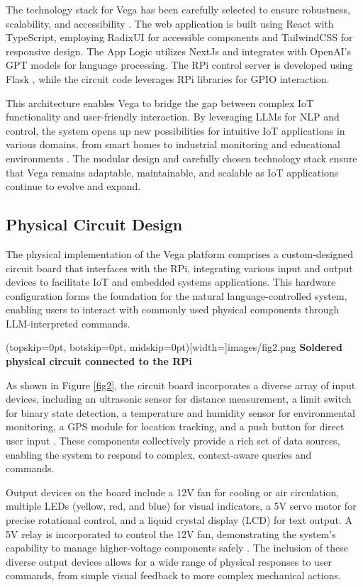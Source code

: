 \documentclass{ieeeaccess}
\begin{document}
The technology stack for Vega has been carefully selected to ensure robustness, scalability, and accessibility \cite{math9040308}. The web application is built using React \cite{React2024} with TypeScript, employing RadixUI \cite{radix-ui} for accessible components and TailwindCSS \cite{tailwindcss} for responsive design. The App Logic utilizes NextJs \cite{NextJS} and integrates with OpenAI's GPT models \cite{OpenAI_GPT} for language processing. The RPi control server is developed using Flask \cite{Flask2024}, while the circuit code leverages RPi libraries for GPIO interaction.

This architecture enables Vega to bridge the gap between complex IoT functionality and user-friendly interaction. By leveraging LLMs for NLP and control, the system opens up new possibilities for intuitive IoT applications in various domains, from smart homes to industrial monitoring and educational environments \cite{8067944}. The modular design and carefully chosen technology stack ensure that Vega remains adaptable, maintainable, and scalable as IoT applications continue to evolve and expand.

\subsection{Physical Circuit Design}
The physical implementation of the Vega platform comprises a custom-designed circuit board that interfaces with the RPi, integrating various input and output devices to facilitate IoT and embedded systems applications. This hardware configuration forms the foundation for the natural language-controlled system, enabling users to interact with commonly used physical components  through LLM-interpreted commands.

\Figure[t!](topskip=0pt, botskip=0pt,
midskip=0pt)[width=\textwidth]{{images/fig2.png}}
{ \textbf{Soldered physical circuit connected to the RPi }\label{fig2}}

As shown in Figure \ref{fig2}, the circuit board incorporates a diverse array of input devices, including an ultrasonic sensor for distance measurement, a limit switch for binary state detection, a temperature and humidity sensor for environmental monitoring, a GPS module for location tracking, and a push button for direct user input \cite{electronicwings_sensors_modules}. These components collectively provide a rich set of data sources, enabling the system to respond to complex, context-aware queries and commands.

Output devices on the board include a 12V fan for cooling or air circulation, multiple LEDs (yellow, red, and blue) for visual indicators, a 5V servo motor for precise rotational control, and a liquid crystal display (LCD) for text output. A 5V relay is incorporated to control the 12V fan, demonstrating the system's capability to manage higher-voltage components safely \cite{smith2020}. The inclusion of these diverse output devices allows for a wide range of physical responses to user commands, from simple visual feedback to more complex mechanical actions.
\end{document}
